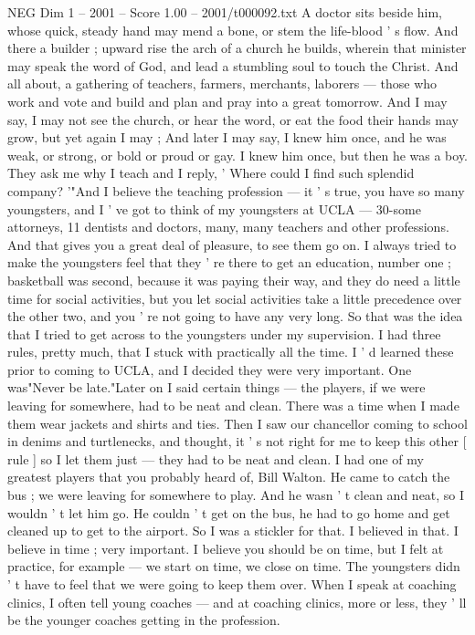 \begin{textsample}{NEG Dim 1 – 2001 – Score 1.00 – 2001/t000092.txt}
A doctor sits beside him, whose quick, steady hand may mend a bone, or stem the life-blood ' s flow.
And there a builder ; upward rise the arch of a church he builds, wherein that minister may speak the word of God, and lead a stumbling soul to touch the Christ.
And all about, a gathering of teachers, farmers, merchants, laborers — those who work and vote and build and plan and pray into a great tomorrow.
And I may say, I may not see the church, or hear the word, or eat the food their hands may grow, but yet again I may ; And later I may say, I knew him once, and he was weak, or strong, or bold or proud or gay.
I knew him once, but then he was a boy.
They ask me why I teach and I reply, ' Where could I find such splendid company? '"And I believe the teaching profession — it ' s true, you have so many youngsters, and I ' ve got to think of my youngsters at UCLA — 30-some attorneys, 11 dentists and doctors, many, many teachers and other professions.
And that gives you a great deal of pleasure, to see them go on.
I always tried to make the youngsters feel that they ' re there to get an education, number one ; basketball was second, because it was paying their way, and they do need a little time for social activities, but you let social activities take a little precedence over the other two, and you ' re not going to have any very long.
So that was the idea that I tried to get across to the youngsters under my supervision.
I had three rules, pretty much, that I stuck with practically all the time.
I ' d learned these prior to coming to UCLA, and I decided they were very important.
One was"Never be late."Later on I said certain things — the players, if we were leaving for somewhere, had to be neat and clean.
There was a time when I made them wear jackets and shirts and ties.
Then I saw our chancellor coming to school in denims and turtlenecks, and thought, it ' s not right for me to keep this other [ rule ] so I let them just — they had to be neat and clean.
I had one of my greatest players that you probably heard of, Bill Walton.
He came to catch the bus ; we were leaving for somewhere to play.
And he wasn ' t clean and neat, so I wouldn ' t let him go.
He couldn ' t get on the bus, he had to go home and get cleaned up to get to the airport.
So I was a stickler for that.
I believed in that.
I believe in time ; very important.
I believe you should be on time, but I felt at practice, for example — we start on time, we close on time.
The youngsters didn ' t have to feel that we were going to keep them over.
When I speak at coaching clinics, I often tell young coaches — and at coaching clinics, more or less, they ' ll be the younger coaches getting in the profession.

\end{textsample}
